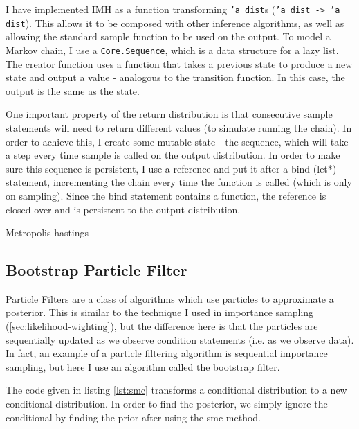 I have implemented IMH as a function transforming \texttt{'a dist}s (\texttt{'a dist -> 'a dist}). This allows it to be composed with other inference algorithms, as well as allowing the standard sample function to be used on the output. To model a Markov chain, I use a \texttt{Core.Sequence}, which is a data structure for a lazy list. The creator function uses a function that takes a previous state to produce a new state and output a value - analogous to the transition function. In this case, the output is the same as the state.

One important property of the return distribution is that consecutive sample statements will need to return different values (to simulate running the chain). In order to achieve this, I create some mutable state - the sequence, which will take a step every time sample is called on the output distribution. In order to make sure this sequence is persistent, I use a reference and put it after a bind (let*) statement, incrementing the chain every time the function is called (which is only on sampling). Since the bind statement contains a function, the reference is closed over and is persistent to the output distribution.

\begin{listing}[!htb]
	\centering
	\caption{Metropolis hastings}
	\label{lst:mh}
\end{listing}

\subsection{Bootstrap Particle Filter} \label{sec:pf}
Particle Filters are a class of algorithms which use particles to approximate a posterior. This is similar to the technique I used in importance sampling (\ref{sec:likelihood-wighting}), but the difference here is that the particles are sequentially updated as we observe condition statements (i.e. as we observe data). In fact, an example of a particle filtering algorithm is sequential importance sampling, but here I use an algorithm called the bootstrap filter\cite{particlefilter}.

The code given in listing \ref{lst:smc} transforms a conditional distribution to a new conditional distribution. In order to find the posterior, we simply ignore the conditional by finding the prior after using the smc method.

